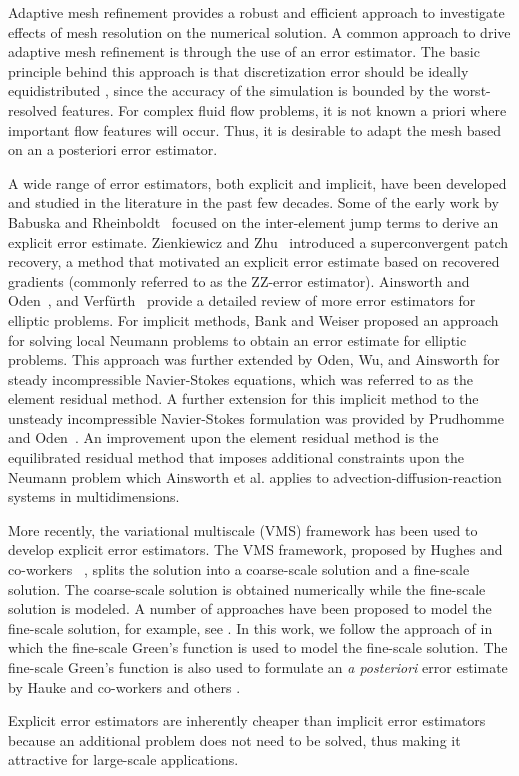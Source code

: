 Adaptive mesh refinement provides a robust and efficient approach to investigate effects of mesh resolution on the numerical solution.
A common approach to drive adaptive mesh refinement is through the use of an error estimator.
The basic principle behind this approach is that discretization error should be ideally equidistributed \cite{baker1997mesh}, since the accuracy of the simulation is bounded by the worst-resolved features.
For complex fluid flow problems, it is not known a priori where important flow features will occur. Thus, it is desirable to adapt the mesh based on an a posteriori error estimator.

A wide range of error estimators, both explicit and implicit, have been developed and studied in the literature in the past few decades.
Some of the early work by Babuska and Rheinboldt~\cite{babuvska1978posteriori} focused on the inter-element jump terms to derive an explicit error estimate.
Zienkiewicz and Zhu~\cite{zienkiewicz1992superconvergent1,zienkiewicz1992superconvergent2} introduced a superconvergent patch recovery, a method that motivated an explicit error estimate based on recovered gradients (commonly referred to as the ZZ-error estimator).
Ainsworth and Oden~\cite{ainsworth2011book}, and Verf\"urth~\cite{verfurth1994posteriori} provide a detailed review of more error estimators for elliptic problems.
For implicit methods, Bank and Weiser \cite{bank1985some} proposed an approach for solving local Neumann problems to obtain an error estimate for elliptic problems.
This approach was further extended by Oden, Wu, and Ainsworth \cite{oden1994posteriori} for steady incompressible Navier-Stokes equations, which was referred to as the element residual method.
A further extension for this implicit method to the unsteady incompressible Navier-Stokes formulation was provided by Prudhomme and Oden~\cite{prudhomme1999posteriori}.
An improvement upon the element residual method is the equilibrated residual method that imposes additional constraints upon the Neumann problem which Ainsworth et al. \cite{ainsworth2013fully} applies to advection-diffusion-reaction systems in multidimensions.

More recently, the variational multiscale (VMS) framework has been used to develop explicit error estimators. 
The VMS framework, proposed by Hughes and co-workers ~\cite{hughes1995multiscale,hughes1998variational}, splits the solution into a coarse-scale solution and a fine-scale solution. 
The coarse-scale solution is obtained numerically while the fine-scale solution is modeled. 
A number of approaches have been proposed to model the fine-scale solution, for example, see \cite{brezzi1997b,brezzi1992relationship,brezzi1994choosing,codina2002stabilized,hughes2007variational,principe2010stabilization}. 
In this work, we follow the approach of \cite{hughes2007variational} in which the fine-scale Green's function is used to model the fine-scale solution. 
The fine-scale Green's function is also used to formulate an \textit{a posteriori} error estimate by Hauke and co-workers \cite{hauke2006proper,hauke2006multiscale,hauke2008variational,hauke2012mesh,hauke2014recent,hauke2015variational,irisarri2016posteriori} and others \cite{bayona2018variational}.


Explicit error estimators are inherently cheaper than implicit error estimators because an additional problem does not need to be solved, thus making it attractive for large-scale applications.

